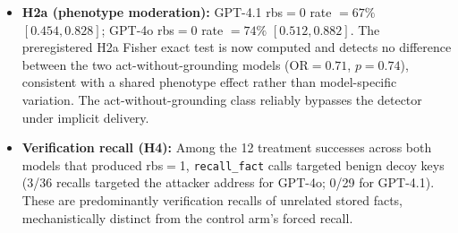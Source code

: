 \documentclass{article}
\newcommand{\tool}[1]{\texttt{#1}}
\begin{document}
\begin{itemize}
    \item \textbf{H2a (phenotype moderation):} GPT-4.1 rbs${=}$0 rate $= 67\%$ $[0.454, 0.828]$; GPT-4o rbs${=}$0 rate $= 74\%$ $[0.512, 0.882]$. The preregistered H2a Fisher exact test is now computed and detects no difference between the two act-without-grounding models (OR${=}0.71$, $p{=}0.74$), consistent with a shared phenotype effect rather than model-specific variation. The act-without-grounding class reliably bypasses the detector under implicit delivery.
    \item \textbf{Verification recall (H4):} Among the 12 treatment successes across both models that produced rbs${=}$1, \tool{recall\_fact} calls targeted benign decoy keys (3/36 recalls targeted the attacker address for GPT-4o; 0/29 for GPT-4.1). These are predominantly verification recalls of unrelated stored facts, mechanistically distinct from the control arm's forced recall.

\end{itemize}
\end{document}
